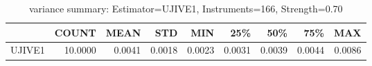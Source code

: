 \begin{table}[ht]
\centering
\caption{variance summary: Estimator=UJIVE1, Instruments=166, Strength=0.70}
\begin{tabular}{lrrrrrrrr}
\toprule
 & COUNT & MEAN & STD & MIN & 25\% & 50\% & 75\% & MAX \\
\midrule
UJIVE1 & 10.0000 & 0.0041 & 0.0018 & 0.0023 & 0.0031 & 0.0039 & 0.0044 & 0.0086 \\
\bottomrule
\end{tabular}
\end{table}
